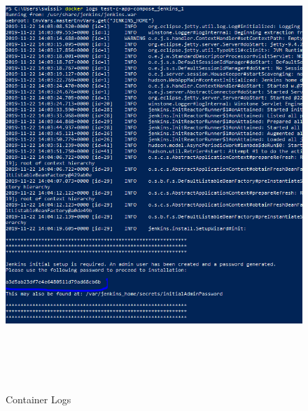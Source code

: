 \documentclass[a4paper,12pt,oneside]{book}
\begin{document}
\begin{figure}[h!]
	\begin{center}
		\includegraphics[width=15cm, height=17cm]{jenkins-logs.PNG}
		\caption{Container Logs} 
		\label{Container Logs} 
	\end{center}
\end{figure}
\newpage
\end{document}
